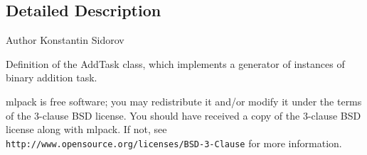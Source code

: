 \subsection{Detailed Description}
\begin{DoxyAuthor}{Author}
Konstantin Sidorov
\end{DoxyAuthor}
Definition of the Add\+Task class, which implements a generator of instances of binary addition task.

mlpack is free software; you may redistribute it and/or modify it under the terms of the 3-\/clause B\+SD license. You should have received a copy of the 3-\/clause B\+SD license along with mlpack. If not, see {\tt http\+://www.\+opensource.\+org/licenses/\+B\+S\+D-\/3-\/\+Clause} for more information. 